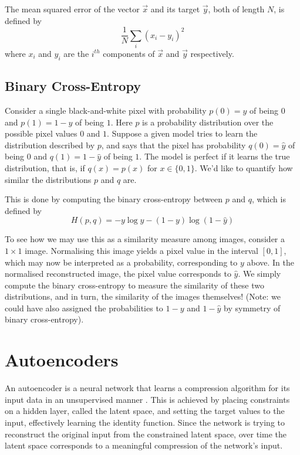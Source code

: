 The mean squared error of the vector $\vec{x}$ and its target $\vec{y}$, both of length $N$, is defined by $$\frac{1}{N}\sum_{i}(x_i - y_i)^2$$ where $x_i$ and $y_i$ are the $i^{th}$ components of $\vec{x}$ and $\vec{y}$ respectively.

\subsection{Binary Cross-Entropy}
Consider a single black-and-white pixel with probability $p(0) = y$ of being $0$ and $p(1) = 1 - y$ of being $1$. Here $p$ is a probability distribution over the possible pixel values $0$ and $1$. Suppose a given model tries to learn the distribution described by $p$, and says that the pixel has probability $q(0) = \hat{y}$ of being $0$ and $q(1) = 1 - \hat{y}$ of being $1$. The model is perfect if it learns the true distribution, that is, if $q(x) = p(x)$ for $x\in\{0,1\}$. We'd like to quantify how similar the distributions $p$ and $q$ are.

This is done by computing the binary cross-entropy between $p$ and $q$, which is defined by $$H(p,q) = -y\log\hat{y} - (1-y)\log(1-\hat{y})$$

To see how we may use this as a similarity measure among images, consider a $1\times1$ image. Normalising this image yields a pixel value in the interval $[0, 1]$, which may now be interpreted as a probability, corresponding to $y$ above. In the normalised reconstructed image, the pixel value corresponds to $\hat{y}$. We simply compute the binary cross-entropy to measure the similarity of these two distributions, and in turn, the similarity of the images themselves! (Note: we could have also assigned the probabilities to $1-y$ and $1-\hat{y}$ by symmetry of binary cross-entropy).


\section{Autoencoders}

An autoencoder is a neural network that learns a compression algorithm for its input data in an unsupervised manner \cite{Liou2008}. This is achieved by placing constraints on a hidden layer, called the latent space, and setting the target values to the input, effectively learning the identity function. Since the network is trying to reconstruct the original input from the constrained latent space, over time the latent space corresponds to a meaningful compression of the network's input.

